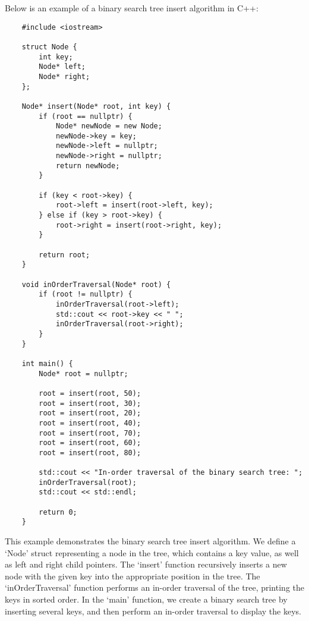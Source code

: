 \begin{solution}
    Below is an example of a binary search tree insert algorithm in C++:

    \horizontalline

    \begin{verbatim}
    #include <iostream>

    struct Node {
        int key;
        Node* left;
        Node* right;
    };
    
    Node* insert(Node* root, int key) {
        if (root == nullptr) {
            Node* newNode = new Node;
            newNode->key = key;
            newNode->left = nullptr;
            newNode->right = nullptr;
            return newNode;
        }
    
        if (key < root->key) {
            root->left = insert(root->left, key);
        } else if (key > root->key) {
            root->right = insert(root->right, key);
        }
    
        return root;
    }
    
    void inOrderTraversal(Node* root) {
        if (root != nullptr) {
            inOrderTraversal(root->left);
            std::cout << root->key << " ";
            inOrderTraversal(root->right);
        }
    }
    
    int main() {
        Node* root = nullptr;
    
        root = insert(root, 50);
        root = insert(root, 30);
        root = insert(root, 20);
        root = insert(root, 40);
        root = insert(root, 70);
        root = insert(root, 60);
        root = insert(root, 80);
    
        std::cout << "In-order traversal of the binary search tree: ";
        inOrderTraversal(root);
        std::cout << std::endl;
    
        return 0;
    }
    \end{verbatim}

    \horizontalline

    This example demonstrates the binary search tree insert algorithm. We define a `Node' struct representing a node in the tree, which contains a key value, as well as left and right child pointers. The `insert' function recursively inserts a new node with the given key into the appropriate position in the tree. The `inOrderTraversal' 
    function performs an in-order traversal of the tree, printing the keys in sorted order. In the `main' function, we create a binary search tree by inserting several keys, and then perform an in-order traversal to display the keys.
\end{solution}

